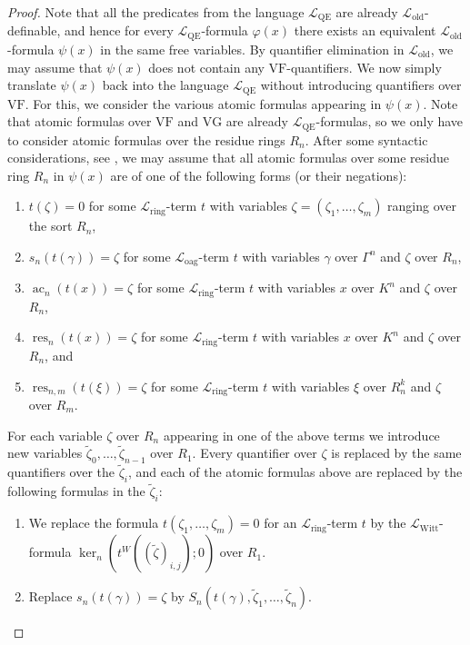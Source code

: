 \documentclass[a4paper]{amsart}
\theoremstyle{mystyle2}
\theoremstyle{mystyle}
\DeclareMathOperator{\res}{res}
\DeclareMathOperator{\ac}{ac}
\renewcommand{\L}{\mathcal{L}}
\newcommand{\Lring}{\L_{\mathrm{ring}}}
\newcommand{\Loag}{\L_{\mathrm{oag}}}
\newcommand{\LWitt}{\L_{\mathrm{Witt}}}
\newcommand{\LQE}{\L_\mathrm{QE}}
\newcommand{\Lold}{\L_\mathrm{old}}
\newcommand{\VF}{\mathrm{VF}}
\newcommand{\VG}{\mathrm{VG}}
\numberwithin{equation}{section}
\begin{document}
\begin{proof}
        Note that all the predicates from the language $\LQE$ are already $\Lold$-definable, and hence for every $\LQE$-formula $\varphi(x)$ there exists an equivalent $\Lold$-formula $\psi(x)$ in the same free variables.
        By quantifier elimination in $\Lold$, we may assume that $\psi(x)$ does not contain any $\VF$-quantifiers.
        We now simply translate $\psi(x)$ back into the language $\LQE$ without introducing quantifiers over $\VF$.
        For this, we consider the various atomic formulas appearing in $\psi(x)$.
        Note that atomic formulas over $\VF$ and $\VG$ are already $\LQE$-formulas, so we only have to consider atomic formulas over the residue rings $R_n$.
        After some syntactic considerations, see \cite[Theorem~2.6.1]{Hod}, we may assume that all atomic formulas over some residue ring $R_n$ in $\psi(x)$ are of one of the following forms (or their negations):
        \begin{enumerate}
            \item $t(\zeta) = 0$ for some $\Lring$-term $t$ with variables $\zeta = (\zeta_1, \ldots, \zeta_m)$ ranging over the sort $R_n$,
            \item $s_n(t(\gamma)) = \zeta$ for some $\Loag$-term $t$ with variables $\gamma$ over $\Gamma^n$ and $\zeta$ over $R_n$,
            \item $\ac_n(t(x)) = \zeta$ for some $\Lring$-term $t$ with variables $x$ over $K^n$ and $\zeta$ over $R_n$,
            \item $\res_n(t(x)) = \zeta$ for some $\Lring$-term $t$ with variables $x$ over $K^n$ and $\zeta$ over $R_n$, and
            \item $\res_{n,m}(t(\xi)) = \zeta$ for some $\Lring$-term $t$ with variables $\xi$ over $R_n^k$ and $\zeta$ over $R_m$.
        \end{enumerate}
        For each variable $\zeta$ over $R_n$ appearing in one of the above terms we introduce new variables $\tilde{\zeta}_0, \ldots, \tilde{\zeta}_{n-1}$ over $R_1$.
        Every quantifier over $\zeta$ is replaced by the same quantifiers over the $\tilde{\zeta}_i$, and each of the atomic formulas above are replaced by the following formulas in the $\tilde{\zeta}_i$:
        \begin{enumerate}
            \item We replace the formula $t(\zeta_1, \ldots, \zeta_m) = 0$ for an $\Lring$-term $t$ by the $\LWitt$-formula $\ker_n(t^W((\tilde{\zeta})_{i,j});  0)$ over $R_1$.
            \item Replace $s_n(t(\gamma)) = \zeta$ by $S_n(t(\gamma), \tilde{\zeta}_1, \ldots, \tilde{\zeta}_n)$.

\end{enumerate}
\end{proof}
\end{document}
